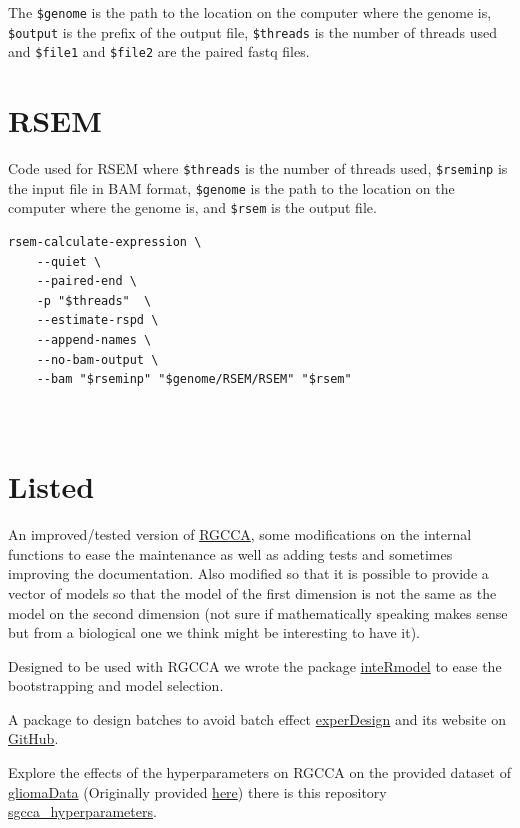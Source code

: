 \documentclass[
  12pt,
  a4paper,
  twoside,
  openright]{book}
\begin{document}
The \texttt{\$genome} is the path to the location on the computer where the genome is, \texttt{\$output} is the prefix of the output file, \texttt{\$threads} is the number of threads used and \texttt{\$file1} and \texttt{\$file2} are the paired fastq files.

\hypertarget{rsem}{%
\section{RSEM}\label{rsem}}

Code used for RSEM where \texttt{\$threads} is the number of threads used, \texttt{\$rseminp} is the input file in BAM format, \texttt{\$genome} is the path to the location on the computer where the genome is, and \texttt{\$rsem} is the output file.

\begin{verbatim}
rsem-calculate-expression \
    --quiet \
    --paired-end \
    -p "$threads"  \
    --estimate-rspd \
    --append-names \
    --no-bam-output \
    --bam "$rseminp" "$genome/RSEM/RSEM" "$rsem"
    
    
\end{verbatim}

\hypertarget{listed}{%
\section{Listed}\label{listed}}

An improved/tested version of \href{https://github.com/llrs/RGCCA}{RGCCA}, some modifications on the internal functions to ease the maintenance as well as adding tests and sometimes improving the documentation.
Also modified so that it is possible to provide a vector of models so that the model of the first dimension is not the same as the model on the second dimension (not sure if mathematically speaking makes sense but from a biological one we think might be interesting to have it).

Designed to be used with RGCCA we wrote the package \href{https:github.com/llrs/inteRmodel}{inteRmodel} to ease the bootstrapping and model selection.

A package to design batches to avoid batch effect \href{https://cran.r-project.org/package=experDesign}{experDesign} and its website on \href{https://github.com/llrs/experDesign}{GitHub}.

Explore the effects of the hyperparameters on RGCCA on the provided dataset of \href{https://github.com/llrs/gliomaData}{gliomaData} (Originally provided \href{http://biodev.cea.fr/sgcca/}{here}) there is this repository \href{https://github.com/llrs/sgcca_hyperparameters}{sgcca\_hyperparameters}.
\end{document}
